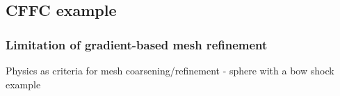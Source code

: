 \documentclass{beamer}
\begin{document}
\subsection[example]{CFFC example}
\begin{frame}
\frametitle{Limitation of gradient-based mesh refinement}
\scriptsize
\begin{minipage}[t][1\textheight]{1\textwidth}
\vspace{-10pt}
\begin{exampleblock}{Physics as criteria for mesh coarsening/refinement - sphere with a bow shock example}
\vspace{-20pt}
\begin{figure}
\label{fig:Gradientbased}
\centering
{}

\end{figure}
\end{exampleblock}
\end{minipage}
\end{frame}
\end{document}
